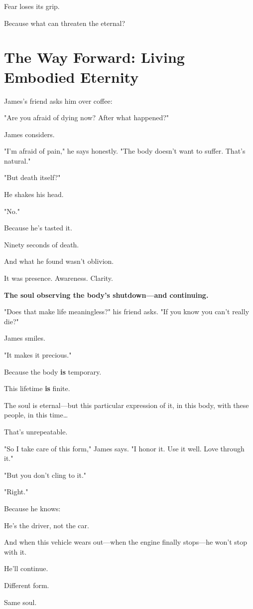 \documentclass[11pt,twoside]{book}
\begin{document}
Fear loses its grip.

Because what can threaten the eternal?

\section*{The Way Forward: Living Embodied Eternity}

James's friend asks him over coffee:

"Are you afraid of dying now? After what happened?"

James considers.

"I'm afraid of pain," he says honestly. "The body doesn't want to suffer. That's natural."

"But death itself?"

He shakes his head.

"No."

Because he's tasted it.

Ninety seconds of death.

And what he found wasn't oblivion.

It was presence. Awareness. Clarity.

\textbf{The soul observing the body's shutdown—and continuing.}

"Does that make life meaningless?" his friend asks. "If you know you can't really die?"

James smiles.

"It makes it precious."

Because the body \textbf{is} temporary.

This lifetime \textbf{is} finite.

The soul is eternal—but this particular expression of it, in this body, with these people, in this time\ldots{}

That's unrepeatable.

"So I take care of this form," James says. "I honor it. Use it well. Love through it."

"But you don't cling to it."

"Right."

Because he knows:

He's the driver, not the car.

And when this vehicle wears out—when the engine finally stops—he won't stop with it.

He'll continue.

Different form.

Same soul.
\end{document}
